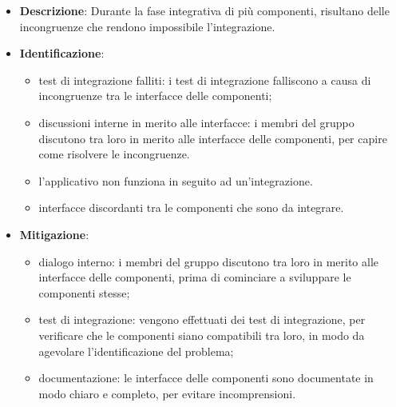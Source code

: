 \label{risk:interfacce incoerenti}
\begin{itemize}
	\item \textbf{Descrizione}:
	      Durante la fase integrativa di più componenti, risultano delle
	      incongruenze che rendono impossibile l'integrazione.
	\item \textbf{Identificazione}:
	      \begin{itemize}
		      \item test di integrazione falliti: i test di integrazione
		            falliscono a causa di incongruenze tra le interfacce delle
		            componenti;

		      \item discussioni interne in merito alle interfacce: i membri
		            del gruppo discutono tra loro in merito alle interfacce
		            delle componenti, per capire come risolvere le incongruenze.

		      \item l'applicativo non funziona in seguito ad un'integrazione.

		      \item interfacce discordanti tra le componenti che sono da
		            integrare.
	      \end{itemize}
	\item \textbf{Mitigazione}:
	      \begin{itemize}
		      \item dialogo interno: i membri del gruppo discutono tra loro
		            in merito alle interfacce delle componenti, prima di
		            cominciare a sviluppare le componenti stesse;

		      \item test di integrazione: vengono effettuati dei test di
		            integrazione, per verificare che le componenti siano
		            compatibili tra loro, in modo da agevolare l'identificazione
		            del problema;

		      \item documentazione: le interfacce delle componenti sono
		            documentate in modo chiaro e completo, per evitare
		            incomprensioni.
	      \end{itemize}
\end{itemize}
